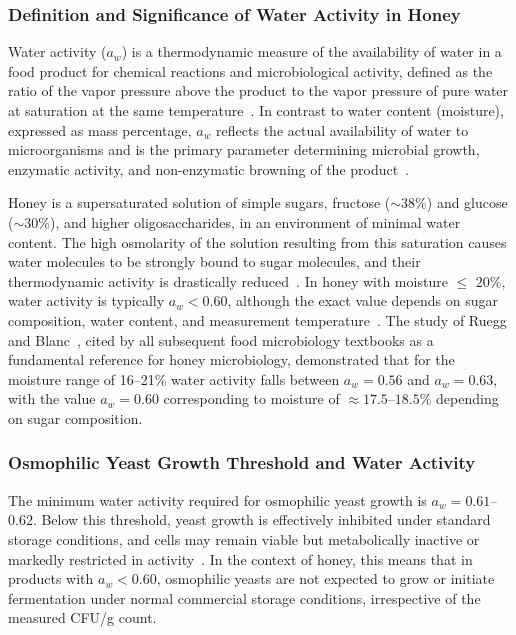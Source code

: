 \documentclass[foods,review,accept,pdftex,moreauthors]{Definitions/mdpi}
\begin{document}
{\subsubsection{Definition and Significance of Water Activity in Honey}

Water activity ($a_w$) is a thermodynamic measure of the
availability of water in a food product for chemical reactions
and microbiological activity, defined as the ratio of the vapor
pressure above the product to the vapor pressure of pure water
at saturation at the same
temperature~\cite{waaw2006}.
In contrast to water content (moisture), expressed as mass
percentage, $a_w$ reflects the actual availability of water to
microorganisms and is the primary parameter determining microbial
growth, enzymatic activity, and non-enzymatic browning of the
product~\cite{waaw2006}.

Honey is a supersaturated solution of simple sugars, fructose
($\sim$$38\%$) and glucose ($\sim$$30\%$), and higher
oligosaccharides, in an environment of minimal water content.
The high osmolarity of the solution resulting from this saturation
causes water molecules to be strongly bound to sugar molecules,
and their thermodynamic activity is drastically
reduced~\cite{zamora2006,waaw2006}. In honey with moisture
$\leq$ $20\%$, water activity is typically $a_w < 0.60$,
although the exact value depends on sugar composition, water
content, and measurement temperature~\cite{ruegg1981,gleiter2006}.
The study of Ruegg and Blanc~\cite{ruegg1981}, cited by all
subsequent food microbiology textbooks as a fundamental reference
for honey microbiology, demonstrated that for the moisture range
of 16--21\% water activity falls between $a_w = 0.56$ and
$a_w = 0.63$, with the value $a_w = 0.60$ corresponding to
moisture of $\approx$$17.5$--$18.5\%$ depending on sugar
composition.

\subsubsection{Osmophilic Yeast Growth Threshold and Water Activity}

The minimum water activity required for osmophilic yeast growth
is $a_w = 0.61$--$0.62$. 
      Below this threshold, yeast growth is effectively inhibited under standard storage conditions, and cells may remain viable but metabolically inactive or markedly restricted in activity~\cite{ruegg1981,alwaili2012}. In the context of honey, this means that in products with $a_w < 0.60$, osmophilic yeasts are not expected to grow or initiate fermentation under normal commercial storage conditions, irrespective of the measured CFU/g count.


}
\end{document}
